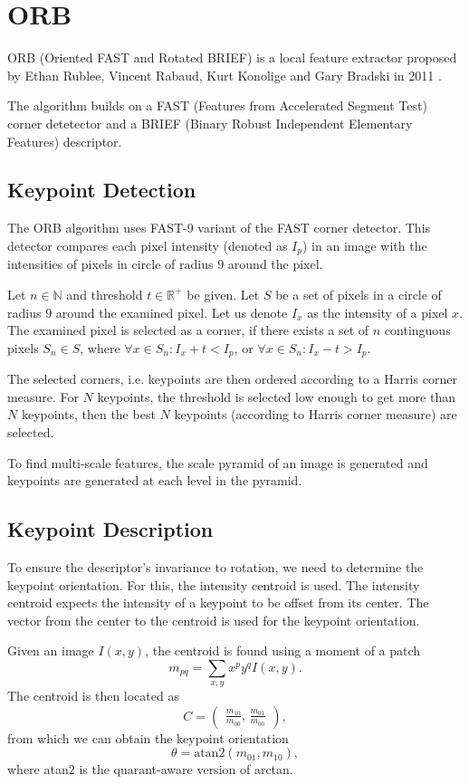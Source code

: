 \section{ORB}
ORB (Oriented FAST and Rotated BRIEF) is a local feature extractor proposed by Ethan Rublee, Vincent Rabaud, Kurt Konolige and Gary Bradski in 2011 \cite{Rublee2011}.

The algorithm builds on a FAST (Features from Accelerated Segment Test) corner detetector\cite{Rosten2006} and a BRIEF (Binary Robust Independent Elementary Features) descriptor\cite{Calonder2010}.

\subsection{Keypoint Detection}
The ORB algorithm uses FAST-9 variant of the FAST corner detector. This detector compares each pixel intensity (denoted as $I_p$) in an image with the intensities of pixels in circle of radius $9$ around the pixel.

Let $n\in\mathbb{N}$ and threshold $t\in\mathbb{R}^{+}$ be given. Let $S$ be a set of pixels in a circle of radius $9$ around the examined pixel. Let us denote $I_x$ as the intensity of a pixel $x$. The examined pixel is selected as a corner, if there exists a set of $n$ continguous pixels $S_n \in S$, where $\forall x \in S_n: I_x + t < I_p$, or $\forall x \in S_n: I_x - t > I_p$.

The selected corners, i.e. keypoints are then ordered according to a Harris corner measure\cite{Harris1988}. For $N$ keypoints, the threshold is selected low enough to get more than $N$ keypoints, then the best $N$ keypoints (according to Harris corner measure) are selected.

To find multi-scale features, the scale pyramid of an image is generated and keypoints are generated at each level in the pyramid.

\subsection{Keypoint Description}
To ensure the descriptor's invariance to rotation, we need to determine the keypoint orientation. For this, the intensity centroid\cite{Rosin1999} is used. The intensity centroid expects the intensity of a keypoint to be offset from its center. The vector from the center to the centroid is used for the keypoint orientation.

Given an image $I(x,y)$, the centroid is found using a moment of a patch
\begin{equation}
    m_{pq}=\sum_{x,y} x^p y^q I(x,y).
\end{equation}
The centroid is then located as
\begin{equation}
    C =
    \begin{pmatrix}
        \frac{m_{10}}{m_{00}} \text{, } \frac{m_{01}}{m_{00}}
    \end{pmatrix},
\end{equation}
from which we can obtain the keypoint orientation
\begin{equation}
    \theta = \text{atan}2(m_{01},m_{10}),
\end{equation}
where atan$2$ is the quarant-aware version of arctan.

